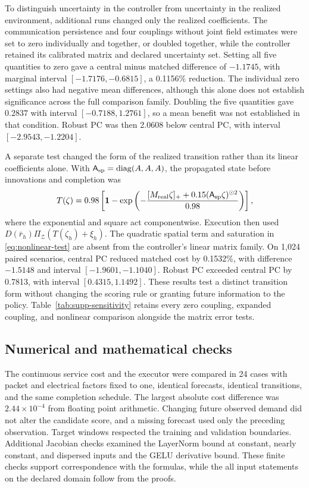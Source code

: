 \documentclass[journal]{IEEEtran}
\begin{document}
To distinguish uncertainty in the controller from uncertainty in the realized
environment, additional runs changed only the realized coefficients.  The
communication persistence and four couplings without joint field estimates
were set to zero individually and together, or doubled together, while the
controller retained its calibrated matrix and declared uncertainty set.
Setting all five quantities to zero gave a central minus matched difference
of $-1.1745$, with marginal interval $[-1.7176,-0.6815]$, a 0.1156\% reduction.
The individual zero settings also had negative mean differences, although
this alone does not establish significance across the full comparison family.
Doubling the five quantities gave $0.2837$ with interval $[-0.7188,1.2761]$,
so a mean benefit was not established in that condition.  Robust PC was then
2.0608 below central PC, with interval $[-2.9543,-1.2204]$.

A separate test changed the form of the realized transition rather than its
linear coefficients alone.  With $\mathsf A_{\rm sp}=\mathrm{diag}(A,A,A)$, the
propagated state before innovations and completion was
\begin{equation}
T(\zeta)=0.98\left[\mathbf1-\exp\left(
-\frac{[M_{\rm real}\zeta]_+ +0.15(\mathsf A_{\rm sp}\zeta)^{\odot2}}{0.98}
\right)\right],
\label{eq:nonlinear-test}
\end{equation}
where the exponential and square act componentwise.  Execution then used
$D(\bar r_h)\Pi_{\mathcal Z}(T(\zeta_h)+\xi_h)$.
The quadratic spatial term and saturation in \eqref{eq:nonlinear-test} are
absent from the controller's linear matrix family.  On 1,024 paired scenarios,
central PC reduced matched cost by 0.1532\%, with difference $-1.5148$ and
interval $[-1.9601,-1.1040]$.  Robust PC exceeded central PC by 0.7813, with
interval $[0.4315,1.1492]$.  These results test a distinct transition form
without changing the scoring rule or granting future information to the policy.
Table~\ref{tab:supp-sensitivity} retains every zero coupling, expanded coupling, and
nonlinear comparison alongside the matrix error tests.



\subsection{Numerical and mathematical checks}
\label{sec:checks}

The continuous service cost and the executor were compared in 24 cases with
packet and electrical factors fixed to one, identical forecasts, identical
transitions, and the same completion schedule.  The largest absolute cost
difference was $2.44\times10^{-4}$ from floating point arithmetic.  Changing
future observed demand did not alter the candidate score, and a missing
forecast used only the preceding observation.  Target windows respected the
training and validation boundaries.  Additional Jacobian checks examined the
LayerNorm bound at constant, nearly constant, and dispersed inputs and the
GELU derivative bound.  These finite checks support correspondence with the
formulas, while the all input statements on the declared domain follow from
the proofs.
\end{document}
